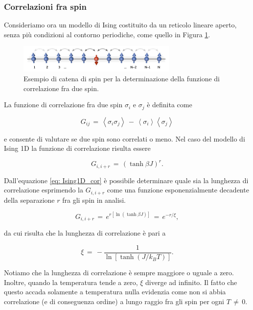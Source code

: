 \subsubsection{Correlazioni fra spin}

Consideriamo ora un modello di Ising costituito da un reticolo lineare aperto, senza più condizioni al contorno periodiche, 
come quello in Figura \ref{fig: Ising1D_open}. 

\begin{figure}[H]
    \centering
    \includegraphics[width=0.7\textwidth]{Immagini/Ising1D_open.png}
    \caption{Esempio di catena di spin per la determinazione della funzione di correlazione fra due spin.}
    \label{fig: Ising1D_open}
\end{figure}

La funzione di correlazione fra due spin $\sigma_i$ e $\sigma_j$ è definita come

\begin{equation}
    G_{ij}\,=\,\left<\sigma_i \sigma_j\right>\,-\,\left<\sigma_i\right>\left<\sigma_j\right>
    \label{eq: def_corr_fun_Ising1D}
\end{equation}

e consente di valutare se due spin sono correlati o meno. Nel caso del modello di Ising 1D la funzione di correlazione 
risulta essere

\begin{equation}
    G_{i, i+r}\,=\,\left(\tanh{\beta J}\right)^r.
    \label{eq: Ising1D_cor}
\end{equation}

Dall'equazione \eqref{eq: Ising1D_cor} è possibile determinare quale sia la lunghezza di correlazione esprimendo la 
$G_{i, i+r}$ come una funzione esponenzialmente decadente della separazione $r$ fra gli spin in analisi. 

\begin{equation}
    G_{i, i+r}\,=\,e^{r\left[\ln{\left(\tanh{\beta J}\right)}\right]}\,=\,e^{-r/\xi},
    \label{eq: Ising1D_corr_exp}
\end{equation}

da cui risulta che la lunghezza di correlazione è pari a 

\begin{equation}
    \xi\,=\,-\frac{1}{\ln{\left[\tanh{\left(J/k_B T\right)}\right]}}.
    \label{eq: lungh_corr}
\end{equation}

Notiamo che la lunghezza di correlazione è sempre maggiore o uguale a zero. Inoltre, quando la temperatura tende a zero, 
$\xi$ diverge ad infinito. Il fatto che questo accada solamente a temperatura nulla evidenzia come non si abbia correlazione 
(e di conseguenza ordine) a lungo raggio fra gli spin per ogni $T\,\neq\,0$.

